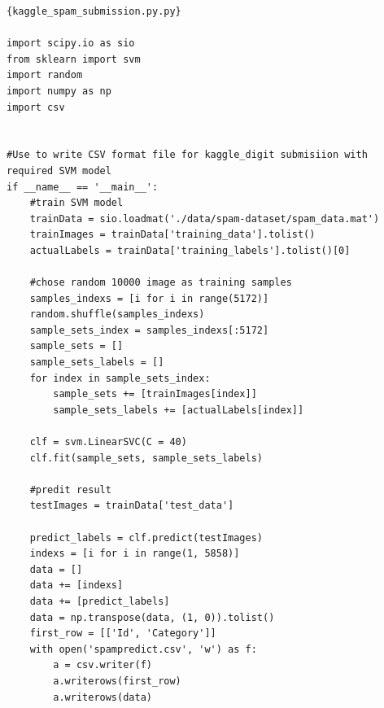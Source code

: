 \documentclass[11pt]{article}
\begin{document}
\newpage
\begin{lstlisting}
{kaggle_spam_submission.py.py}

import scipy.io as sio
from sklearn import svm
import random
import numpy as np
import csv


#Use to write CSV format file for kaggle_digit submisiion with required SVM model
if __name__ == '__main__':
	#train SVM model
	trainData = sio.loadmat('./data/spam-dataset/spam_data.mat')
	trainImages = trainData['training_data'].tolist()
	actualLabels = trainData['training_labels'].tolist()[0]

	#chose random 10000 image as training samples
	samples_indexs = [i for i in range(5172)]
	random.shuffle(samples_indexs)
	sample_sets_index = samples_indexs[:5172]
	sample_sets = []
	sample_sets_labels = []
	for index in sample_sets_index:
		sample_sets += [trainImages[index]]
		sample_sets_labels += [actualLabels[index]]

	clf = svm.LinearSVC(C = 40)
	clf.fit(sample_sets, sample_sets_labels)

	#predit result
	testImages = trainData['test_data']

	predict_labels = clf.predict(testImages)
	indexs = [i for i in range(1, 5858)]
	data = []
	data += [indexs]
	data += [predict_labels]
	data = np.transpose(data, (1, 0)).tolist()
	first_row = [['Id', 'Category']]
	with open('spampredict.csv', 'w') as f:
	    a = csv.writer(f)
	    a.writerows(first_row)
	    a.writerows(data)





\end{lstlisting}
\end{document}
